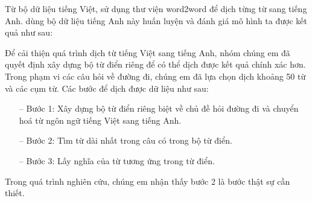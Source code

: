 	
 

Từ bộ dữ liệu tiếng Việt, sử dụng thư viện word2word để dịch từng từ sang tiếng Anh. dùng bộ dữ liệu tiếng Anh này huấn luyện và đánh giá mô hình ta được kết quả như sau:


Để cải thiện quá trình dịch từ tiếng Việt sang tiếng Anh, nhóm chúng em đã quyết định xây dựng bộ từ điển riêng để có thể dịch được kết quả chính xác hơn.
Trong phạm vi các câu hỏi về đường đi, chúng em đã lựa chọn dịch khoảng 50 từ và các cụm từ. Các bước để dịch được dữ liệu như sau:
\begin{itemize}
    \item[--] Bước 1: Xây dựng bộ từ điển riêng biệt về chủ đề hỏi đường đi và chuyển hoá từ ngôn ngữ tiếng Việt sang tiếng Anh.
    \item[--] Bước 2: Tìm từ dài nhất trong câu có trong bộ từ điển.
    \item[--] Bước 3: Lấy nghĩa của từ tương ứng trong từ điển.
\end{itemize}
Trong quá trình nghiên cứu, chúng em nhận thấy bước 2 là bước thật sự cần thiết.
